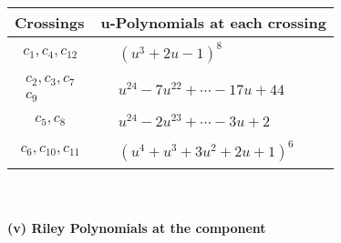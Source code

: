\documentclass[1p]{elsarticle_modified}
\theoremstyle{definition}
\begin{document}
\begin{tabular}{m{50pt}|m{274pt}}
Crossings & \hspace{64pt}u-Polynomials at each crossing \\
\hline $$\begin{aligned}c_{1},c_{4},c_{12}\end{aligned}$$&$\begin{aligned}
&(u^3+2 u-1)^8
\end{aligned}$\\
\hline $$\begin{aligned}c_{2},c_{3},c_{7}\\c_{9}\end{aligned}$$&$\begin{aligned}
&u^{24}-7 u^{22}+\cdots-17 u+44
\end{aligned}$\\
\hline $$\begin{aligned}c_{5},c_{8}\end{aligned}$$&$\begin{aligned}
&u^{24}-2 u^{23}+\cdots-3 u+2
\end{aligned}$\\
\hline $$\begin{aligned}c_{6},c_{10},c_{11}\end{aligned}$$&$\begin{aligned}
&(u^4+u^3+3 u^2+2 u+1)^6
\end{aligned}$\\
\hline
\end{tabular}\\~\\
\newpage\renewcommand{\arraystretch}{1}
\flushleft \textbf{(v) Riley Polynomials at the component}\newline \\
\end{document}
